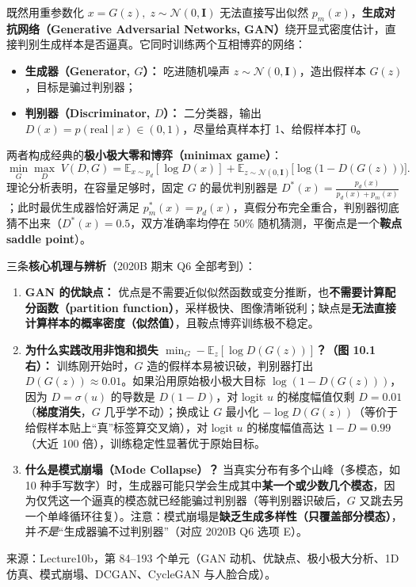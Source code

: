 既然用重参数化 $x=G(z),\; z\sim\mathcal{N}(0,\mathbf{I})$ 无法直接写出似然 $p_m(x)$，\textbf{生成对抗网络（Generative Adversarial Networks, GAN）}绕开显式密度估计，直接判别生成样本是否逼真。它同时训练两个互相博弈的网络：
\begin{itemize}
\item \textbf{生成器（Generator, $G$）：} 吃进随机噪声 $z\sim\mathcal{N}(0,\mathbf{I})$，造出假样本 $G(z)$，目标是骗过判别器；
\item \textbf{判别器（Discriminator, $D$）：} 二分类器，输出 $D(x)=p(\text{real}\mid x)\in(0,1)$，尽量给真样本打 1、给假样本打 0。
\end{itemize}
两者构成经典的\textbf{极小极大零和博弈（minimax game）}：
\[
\min_{G}\max_{D}\; V(D,G) = \mathbb{E}_{x\sim p_d}[\log D(x)] + \mathbb{E}_{z\sim\mathcal{N}(0,\mathbf{I})}\bigl[\log\bigl(1 - D(G(z))\bigr)\bigr].
\tag{10.5}
\]
理论分析表明，在容量足够时，固定 $G$ 的最优判别器是 $D^*(x) = \frac{p_d(x)}{p_d(x)+p_m(x)}$；此时最优生成器恰好满足 $p_m^*(x)=p_d(x)$，真假分布完全重合，判别器彻底猜不出来（$D^*(x)=0.5$，双方准确率均停在 50\% 随机猜测，平衡点是一个\textbf{鞍点 saddle point}）。

三条\textbf{核心机理与辨析}（2020B 期末 Q6 全部考到）：
\begin{enumerate}
\item \textbf{GAN 的优缺点：} 优点是不需要近似似然函数或变分推断，也\textbf{不需要计算配分函数（partition function）}，采样极快、图像清晰锐利；缺点是\textbf{无法直接计算样本的概率密度（似然值）}，且鞍点博弈训练极不稳定。
\item \textbf{为什么实践改用非饱和损失 $\min_G -\mathbb{E}_z[\log D(G(z))]$？（图 10.1 右）：} 训练刚开始时，$G$ 造的假样本易被识破，判别器打出 $D(G(z))\approx 0.01$。如果沿用原始极小极大目标 $\log(1-D(G(z)))$，因为 $D=\sigma(u)$ 的导数是 $D(1-D)$，对 logit $u$ 的梯度幅值仅剩 $D = 0.01$（\textbf{梯度消失}，$G$ 几乎学不动）；换成让 $G$ 最小化 $-\log D(G(z))$（等价于给假样本贴上“真”标签算交叉熵），对 logit $u$ 的梯度幅值高达 $1-D = 0.99$（大近 100 倍），训练稳定性显著优于原始目标。
\item \textbf{什么是模式崩塌（Mode Collapse）？} 当真实分布有多个山峰（多模态，如 10 种手写数字）时，生成器可能只学会生成其中\textbf{某一个或少数几个模态}，因为仅凭这一个逼真的模态就已经能骗过判别器（等判别器识破后，$G$ 又跳去另一个单峰循环往复）。注意：模式崩塌是\textbf{缺乏生成多样性（只覆盖部分模态）}，并\emph{不是}“生成器骗不过判别器”（对应 2020B Q6 选项 E）。
\end{enumerate}

来源：Lecture10b，第 84–193 个单元（GAN 动机、优缺点、极小极大分析、1D 仿真、模式崩塌、DCGAN、CycleGAN 与人脸合成）。


